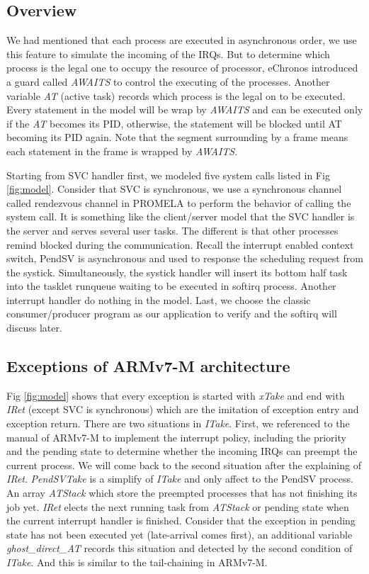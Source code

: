 \subsection{Overview}
We had mentioned that each process are executed in asynchronous order, we use this feature to simulate the incoming of the IRQs. But to determine which process is the legal one to occupy the resource of processor, eChronos introduced a guard called \textit{AWAITS} to control the executing of the processes. Another variable \textit{AT} (active task) records which process is the legal on to be executed. Every statement in the model will be wrap by \textit{AWAITS} and can be executed only if the \textit{AT} becomes its PID, otherwise, the statement will be blocked until AT becoming its PID again. Note that the segment surrounding by a frame means each statement in the frame is wrapped by \textit{AWAITS}.

Starting from SVC handler first, we modeled five system calls listed in Fig \ref{fig:model}. Consider that SVC is synchronous, we use a synchronous channel called rendezvous channel in PROMELA to perform the behavior of calling the system call. It is something like the client/server model that the SVC handler is the server and serves several user tasks. The different is that other processes remind blocked during the communication. Recall the interrupt enabled context switch, PendSV is asynchronous and used to response the scheduling request from the systick. Simultaneously, the systick handler will insert its bottom half task into the tasklet runqueue waiting to be executed in softirq process. Another interrupt handler do nothing in the model. Last, we choose the classic consumer/producer program as our application to verify and the softirq will discuss later.

\subsection{Exceptions of ARMv7-M architecture}
Fig \ref{fig:model} shows that every exception is started with \textit{xTake} and end with \textit{IRet} (except SVC is synchronous) which are the imitation of exception entry and exception return. There are two situations in \textit{ITake}. First, we referenced to the manual of ARMv7-M to implement the interrupt policy, including the priority and the pending state to determine whether the incoming IRQs can preempt the current process. We will come back to the second situation after the explaining of \textit{IRet}. \textit{PendSVTake} is a simplify of \textit{ITake} and only affect to the PendSV process. An array \textit{ATStack} which store the preempted processes that has not finishing its job yet. \textit{IRet} elects the next running task from \textit{ATStack} or pending state when the current interrupt handler is finished. Consider that the exception in pending state has not been executed yet (late-arrival comes first), an additional variable \textit{ghost\_direct\_AT} records this situation and detected by the second condition of \textit{ITake}. And this is similar to the tail-chaining in ARMv7-M.

